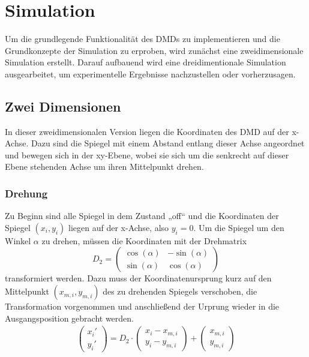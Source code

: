 \section{Simulation}
Um die grundlegende Funktionalität des DMDs zu implementieren und die Grundkonzepte der Simulation zu erproben, wird zunächst eine zweidimensionale Simulation erstellt. Darauf aufbauend wird eine dreidimentionale Simulation ausgearbeitet, um experimentelle Ergebnisse nachzustellen oder vorherzusagen.


\subsection{Zwei Dimensionen}
In dieser zweidimensionalen Version liegen die Koordinaten des DMD auf der x-Achse. Dazu sind die Spiegel mit einem Abstand entlang dieser Achse angeordnet und bewegen sich in der xy-Ebene, wobei sie sich um die senkrecht auf dieser Ebene stehenden Achse um ihren Mittelpunkt drehen.
\subsubsection{Drehung}
Zu Beginn sind alle Spiegel in dem Zustand „off“ und die Koordinaten der Spiegel $(x_i, y_i)$ liegen auf der x-Achse, also $y_i=0$. Um die Spiegel um den Winkel $\alpha$ zu drehen, müssen die Koordinaten mit der Drehmatrix
\begin{equation}
    D_2=\left(\begin{matrix}
        \cos(\alpha) & -\sin(\alpha)\\ 
        \sin(\alpha) & \cos(\alpha)
    \end{matrix}\right)
\end{equation}
transformiert werden. Dazu muss der Koordinatenursprung kurz auf den Mittelpunkt $(x_{m,i}, y_{m,i})$ des zu drehenden Spiegels verschoben, die Transformation vorgenommen und anschließend der Urprung wieder in die Ausgangsposition gebracht werden.
\begin{equation}
    \begin{aligned}
        \left(\begin{matrix}
            x_i'\\y_i'
        \end{matrix}\right) =
        D_2 \cdot
        \left(\begin{matrix}
            x_i - x_{m,i}\\ 
            y_i - y_{m,i}
        \end{matrix}\right) + 
        \left(\begin{matrix}
            x_{m,i}\\ 
            y_{m,i}
        \end{matrix}\right)
    \end{aligned}
\end{equation}

